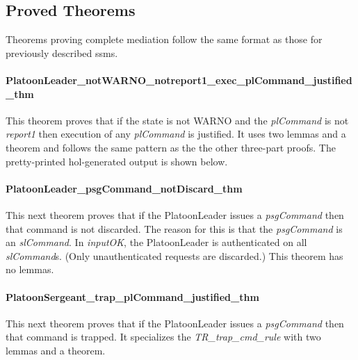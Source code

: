 \documentclass[../../main/main.tex]{subfiles}
\begin{document}
\subsection{Proved Theorems}
Theorems proving complete mediation follow the same format as those for previously described \glspl{ssm}.

\paragraph*{PlatoonLeader_notWARNO_notreport1_exec_plCommand_justified_thm}
This theorem proves that if the state is not WARNO and the \textit{plCommand} is not \textit{report1} then execution of any \textit{plCommand} is justified.  It uses two lemmas and a theorem and follows the same pattern as the the other three-part proofs.  The pretty-printed \gls{hol}-generated output is shown below.

\HOLssmPlanPBTheoremsPlatoonLeaderXXnotWARNOXXnotreportOneXXexecXXplCommandXXlemma

\HOLssmPlanPBTheoremsPlatoonLeaderXXnotWARNOXXnotreportOneXXexecXXplCommandXXjustifiedXXlemma

\HOLssmPlanPBTheoremsPlatoonLeaderXXnotWARNOXXnotreportOneXXexecXXplCommandXXjustifiedXXthm

\paragraph*{PlatoonLeader_psgCommand_notDiscard_thm}
This next theorem proves that if the PlatoonLeader issues a \textit{psgCommand} then that command is not discarded.  The reason for this is that the \textit{psgCommand} is an \textit{slCommand}.  In \textit{inputOK}, the PlatoonLeader is authenticated on all \textit{slCommand}s.  (Only unauthenticated requests are discarded.)  This theorem has no lemmas.

\HOLssmPlanPBTheoremsPlatoonLeaderXXpsgCommandXXnotDiscardXXthm


\paragraph*{PlatoonSergeant_trap_plCommand_justified_thm}
This next theorem proves that if the PlatoonLeader issues a \textit{psgCommand} then that command is trapped.  It specializes the \textit{TR_trap_cmd_rule} with two lemmas and a theorem.
\end{document}
